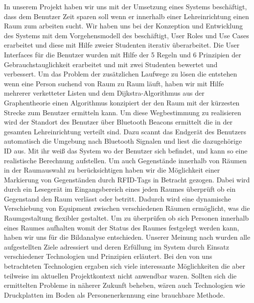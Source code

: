 In unserem Projekt haben wir uns mit der Umsetzung eines Systems beschäftigt,
dass dem Benutzer Zeit sparen soll wenn er innerhalb einer Lehreinrichtung
einen Raum zum arbeiten sucht. Wir haben uns bei der Konzeption und Entwicklung
des Systems mit dem Vorgehensmodell des \citep{[Usage-Centred Design](Buch)}
beschäftigt, User Roles und Use Cases erarbeitet und diese mit Hilfe zweier
Studenten iterativ überarbeitet. Die User Interfaces für die Benutzer wurden
mit Hilfe der 5 Regeln und 6 Prinzipien der Gebrauchstauglichkeit erarbeitet
und mit zwei Studenten bewertet und verbessert. Um das Problem der zusätzlichen
Laufwege zu lösen die entstehen wenn eine Person suchend von Raum zu Raum
läuft, haben wir mit Hilfe mehrerer verketteter Listen und dem
Dijkstra-Algorithmus aus der Graphentheorie einen Algorithmus konzipiert der den
Raum mit der kürzesten Strecke zum Benutzer ermitteln kann. Um diese
Wegbestimmung zu realisieren wird der Standort des Benutzer über Bluetooth
Beacons ermittelt die in der gesamten Lehreinrichtung verteilt sind.
Dazu scannt das Endgerät des Benutzers automatisch die Umgebung nach Bluetooth
Signalen und liest die dazugehörige ID aus. Mit ihr weiß das System wo der
Benutzer sich befindet, und kann so eine realistische Berechnung aufstellen.
Um auch Gegenstände innerhalb von Räumen in der Raumauswahl zu berücksichtigen
haben wir die Möglichkeit einer Markierung von Gegenständen durch RFID-Tags in
Betracht gezogen. Dabei wird durch ein Lesegerät im Eingangsbereich eines jeden
Raumes überprüft ob ein Gegenstand den Raum verlässt oder betritt. Dadurch wird
eine dynamische Verschiebung von Equipment zwischen verschiedenen Räumen
ermöglicht, was die Raumgestaltung flexibler gestaltet. Um zu überprüfen ob
sich Personen innerhalb eines Raumes aufhalten womit der Status des Raumes
festgelegt werden kann, haben wir uns für die Bildanalyse entschieden.
Unserer Meinung nach wurden alle aufgestellten Ziele adressiert und deren
Erfüllung im System durch Einsatz verschiedener Technologien und Prinzipien
erläutert.
Bei den von uns betrachteten Technologien ergaben sich viele interessante
Möglichkeiten die aber teilweise im aktuellen Projektkontext nicht anwendbar
waren. Sollten sich die ermittelten Probleme in näherer Zukunft beheben, wären
auch Technologien wie Druckplatten im Boden als Personenerkennung eine
brauchbare Methode.